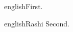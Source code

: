 \documentclass{beamer}
\begin{document}
\begin{mekor}
\begin{mekorlang}{english}{}First.\end{mekorlang}
\end{mekor}
\begin{mekor}
\begin{mekorlang}{english}{Rashi \sham}Second.\end{mekorlang}
\end{mekor}
\end{document}
